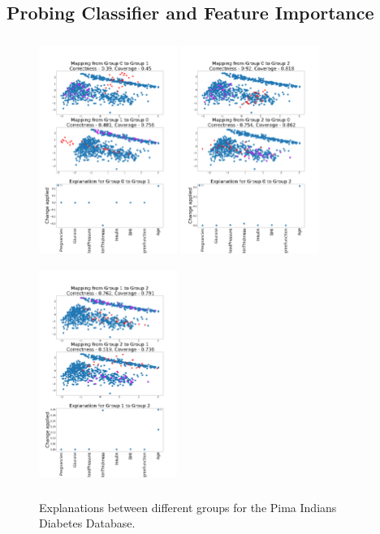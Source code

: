 \subsection{Probing Classifier and Feature Importance}
\label{app:dc}
\begin{figure}
    \includegraphics[width=0.4\textwidth, height=7.2cm]{../openreview/images/diabetes/diabetes-0to1.png}
    \includegraphics[width=0.4\textwidth, height=7.2cm]{../openreview/images/diabetes/diabetes-0to2.png}
    \includegraphics[width=0.4\textwidth, height=7.2cm]{../openreview/images/diabetes/diabetes-1to2.png}
    \caption{Explanations between different groups for the Pima Indians Diabetes Database.}
    \label{fig:diabetes_0}
\end{figure}
